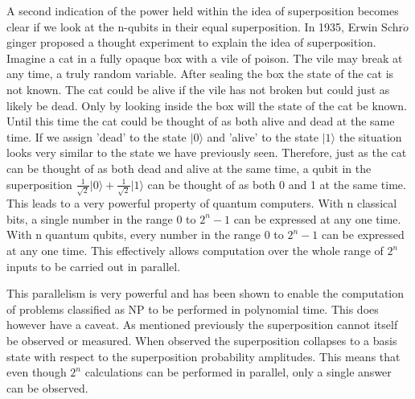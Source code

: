 \documentclass[authoryearcitations]{UoYCSproject}
\begin{document}
A second indication of the power held within the idea of superposition becomes clear if we look at the n-qubits in their equal superposition.
In 1935, Erwin Schr$\ddot{o}$ginger\cite{SchroedingersCat} proposed a thought experiment to explain the idea of superposition.
Imagine a cat in a fully opaque box with a vile of poison.
The vile may break at any time, a truly random variable.
After sealing the box the state of the cat is not known.
The cat could be alive if the vile has not broken but could just as likely be dead.
Only by looking inside the box will the state of the cat be known.
Until this time the cat could be thought of as both alive and dead at the same time.
If we assign 'dead' to the state $\vert0\rangle$ and 'alive' to the state $\vert1\rangle$ the situation looks very similar to the state we have previously seen.
Therefore, just as the cat can be thought of as both dead and alive at the same time, a qubit in the superposition $\frac{1}{\sqrt{2}}\vert0\rangle+\frac{1}{\sqrt{2}}\vert1\rangle$ can be thought of as both 0 and 1 at the same time.
This leads to a very powerful property of quantum computers.
With n classical bits, a single number in the range 0 to $2^n-1$ can be expressed at any one time.
With n quantum qubits, every number in the range 0 to $2^n-1$ can be expressed at any one time.
This effectively allows computation over the whole range of $2^n$ inputs to be carried out in parallel.

This parallelism is very powerful and has been shown to enable the computation of problems classified as NP to be performed in polynomial time.
This does however have a caveat.
As mentioned previously the superposition cannot itself be observed or measured.
When observed the superposition collapses to a basis state with respect to the superposition probability amplitudes.
This means that even though $2^n$ calculations can be performed in parallel, only a single answer can be observed.
\end{document}
